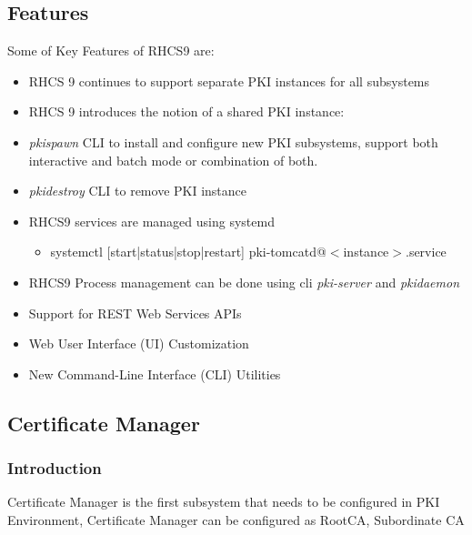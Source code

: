 \documentclass[a4paper]{article}
\begin{document}
\subsection{Features}
    Some of Key Features of RHCS9 are: 
    \begin{itemize}
        \item RHCS 9 continues to support separate PKI instances for all subsystems
        \item RHCS 9 introduces the notion of a shared PKI instance:
        \item \textit{pkispawn} CLI to install and configure new PKI subsystems, support both 
            interactive and batch mode or combination of both.
        \item \textit{pkidestroy} CLI to remove PKI instance
        \item RHCS9 services are managed using systemd 
            \begin{itemize}
                \item systemctl [start|status|stop|restart] pki-tomcatd@$<$instance$>$.service
            \end{itemize}
        \item RHCS9 Process management can be done using cli \textit{pki-server} and \textit{pkidaemon}
        \item Support for REST Web Services APIs
        \item Web User Interface (UI) Customization
        \item New Command-Line Interface (CLI) Utilities
    \end{itemize}
\subsection{Certificate Manager}
\subsubsection{Introduction}
Certificate Manager is the first subsystem that needs to be configured in PKI Environment, Certificate Manager can be configured as RootCA, Subordinate CA
\end{document}
